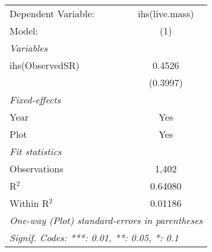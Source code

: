 \begin{tabular}{lc}
\tabularnewline\midrule\midrule
Dependent Variable:&ihs(live.mass)\\
Model:&(1)\\
\midrule \emph{Variables}&  \\
ihs(ObservedSR)&0.4526\\
  &(0.3997)\\
\midrule \emph{Fixed-effects}&  \\
Year & Yes\\
Plot & Yes\\
\midrule \emph{Fit statistics}&  \\
Observations & 1,402\\
R$^2$ & 0.64080\\
Within R$^2$ & 0.01186\\
\midrule\midrule\multicolumn{2}{l}{\emph{One-way (Plot) standard-errors in parentheses}}\\
\multicolumn{2}{l}{\emph{Signif. Codes: ***: 0.01, **: 0.05, *: 0.1}}\\
\end{tabular}


